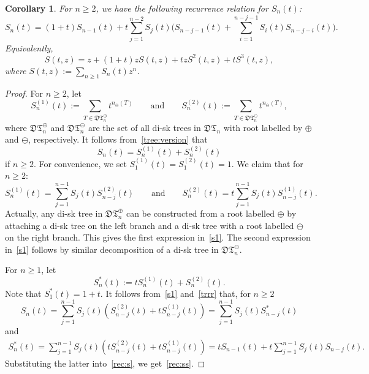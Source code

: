 \documentclass[12pt]{amsart}
\numberwithin{equation}{section}
\theoremstyle{plain}
\newtheorem{corollary}[theorem]{Corollary}
\theoremstyle{definition}
\def\D{\mathfrak{D}}
\def\T{\mathfrak{T}}
\begin{document}
\begin{corollary}
For $n\geq2$, we have the following recurrence relation for $S_n(t)$:
\begin{equation}\label{rec:ss}
S_n(t)=(1+t)S_{n-1}(t)+t\sum_{j=1}^{n-2}S_j(t)\biggl(S_{n-j-1}(t)+\sum_{i=1}^{n-j-1}S_i(t)S_{n-j-i}(t)\biggr).
\end{equation}
Equivalently, 
\begin{equation*}\label{cubic}
S(t,z)=z+(1+t)zS(t,z)+tzS^2(t,z)+tS^3(t,z),
\end{equation*}
where $S(t,z):=\sum_{n\geq1}S_n(t)z^n$.
\end{corollary}
\begin{proof}

For $n\geq2$, let 
$$
S_n^{(1)}(t):=\sum_{T\in\D\T^{\oplus}_n}t^{n_\ominus(T)}\qquad\text{and}\qquad S_n^{(2)}(t):=\sum_{T\in\D\T^{\ominus}_n}t^{n_\ominus(T)},
$$
where $\D\T^{\oplus}_n$ and  $\D\T^{\ominus}_n$ are the set of all di-sk trees in $\D\T_n$ with root labelled by $\oplus$ and $\ominus$, respectively. 
It follows from~\eqref{tree:version} that
\begin{equation}\label{trrr}
S_n(t)=S_n^{(1)}(t)+S_n^{(2)}(t)
\end{equation}
 if $n\geq2$. For convenience, we set $S_1^{(1)}(t)=S_1^{(2)}(t)=1$. 
We claim that for $n\geq2$:
\begin{equation}\label{s1}
S_n^{(1)}(t)=\sum_{j=1}^{n-1}S_j(t)S_{n-j}^{(2)}(t)\qquad\text{and}\qquad S_n^{(2)}(t)=t\sum_{j=1}^{n-1}S_j(t)S_{n-j}^{(1)}(t).
\end{equation}
Actually,  any di-sk tree in $\D\T^{\oplus}_n$ can be constructed from a root labelled $\oplus$ by attaching a di-sk tree on the left branch and a di-sk tree with a root labelled $\ominus$ on the right branch. This gives the first expression in~\eqref{s1}. The second expression in~\eqref{s1} follows by similar decomposition of a di-sk tree in $\D\T^{\ominus}_n$.


For $n\geq1$, let 
$$
S^*_n(t):=tS_n^{(1)}(t)+S_n^{(2)}(t).
$$
Note that $S^*_1(t)=1+t$.
It follows from~\eqref{s1} and~\eqref{trrr} that, for $n\geq2$
\begin{equation}\label{rec:s}
S_n(t)=\sum_{j=1}^{n-1}S_j(t)(S_{n-j}^{(2)}(t)+tS_{n-j}^{(1)}(t))=\sum_{j=1}^{n-1}S_j(t)S^*_{n-j}(t)
\end{equation}
and 
\begin{align*}
S^*_n(t)=\sum_{j=1}^{n-1}S_j(t)(tS_{n-j}^{(2)}(t)+tS_{n-j}^{(1)}(t))=tS_{n-1}(t)+t\sum_{j=1}^{n-1}S_j(t)S_{n-j}(t).
\end{align*}
Substituting the latter into~\eqref{rec:s}, we get~\eqref{rec:ss}.
\end{proof}
\end{document}
